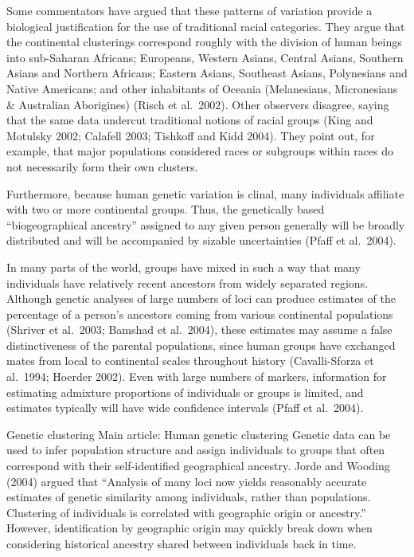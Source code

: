 Some commentators have argued that these patterns of variation provide a biological justification for the use of traditional racial categories. They argue that the continental clusterings correspond roughly with the division of human beings into sub-Saharan Africans; Europeans, Western Asians, Central Asians, Southern Asians and Northern Africans; Eastern Asians, Southeast Asians, Polynesians and Native Americans; and other inhabitants of Oceania (Melanesians, Micronesians \& Australian Aborigines) (Risch et al.~2002). Other observers disagree, saying that the same data undercut traditional notions of racial groups (King and Motulsky 2002; Calafell 2003; Tishkoff and Kidd 2004). They point out, for example, that major populations considered races or subgroups within races do not necessarily form their own clusters.

Furthermore, because human genetic variation is clinal, many individuals affiliate with two or more continental groups. Thus, the genetically based ``biogeographical ancestry'' assigned to any given person generally will be broadly distributed and will be accompanied by sizable uncertainties (Pfaff et al.~2004).

In many parts of the world, groups have mixed in such a way that many individuals have relatively recent ancestors from widely separated regions. Although genetic analyses of large numbers of loci can produce estimates of the percentage of a person's ancestors coming from various continental populations (Shriver et al.~2003; Bamshad et al.~2004), these estimates may assume a false distinctiveness of the parental populations, since human groups have exchanged mates from local to continental scales throughout history (Cavalli-Sforza et al.~1994; Hoerder 2002). Even with large numbers of markers, information for estimating admixture proportions of individuals or groups is limited, and estimates typically will have wide confidence intervals (Pfaff et al.~2004).

Genetic clustering
Main article: Human genetic clustering
Genetic data can be used to infer population structure and assign individuals to groups that often correspond with their self-identified geographical ancestry. Jorde and Wooding (2004) argued that ``Analysis of many loci now yields reasonably accurate estimates of genetic similarity among individuals, rather than populations. Clustering of individuals is correlated with geographic origin or ancestry.'' However, identification by geographic origin may quickly break down when considering historical ancestry shared between individuals back in time.

